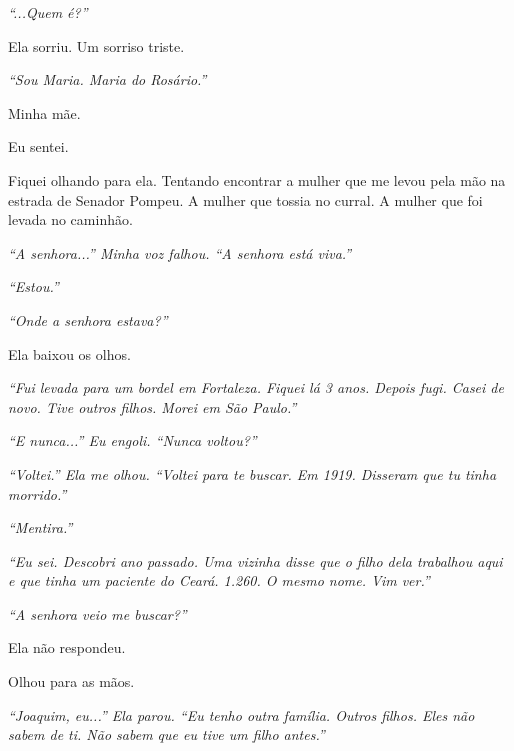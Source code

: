 \noindent \textit{\textquotedblleft{}...Quem é?\textquotedblright{}}

\noindent Ela sorriu. Um sorriso triste.

\noindent \textit{\textquotedblleft{}Sou Maria. Maria do Rosário.\textquotedblright{}}

\noindent Minha mãe.

\noindent Eu sentei.

\noindent Fiquei olhando para ela. Tentando encontrar a mulher que me levou pela mão na estrada de Senador Pompeu. A mulher que tossia no curral. A mulher que foi levada no caminhão.

\noindent \textit{\textquotedblleft{}A senhora...\textquotedblright{}\textit{ Minha voz falhou. }\textquotedblleft{}A senhora está viva.\textquotedblright{}}

\noindent \textit{\textquotedblleft{}Estou.\textquotedblright{}}

\noindent \textit{\textquotedblleft{}Onde a senhora estava?\textquotedblright{}}

\noindent Ela baixou os olhos.

\noindent \textit{\textquotedblleft{}Fui levada para um bordel em Fortaleza. Fiquei lá 3 anos. Depois fugi. Casei de novo. Tive outros filhos. Morei em São Paulo.\textquotedblright{}}

\noindent \textit{\textquotedblleft{}E nunca...\textquotedblright{}\textit{ Eu engoli. }\textquotedblleft{}Nunca voltou?\textquotedblright{}}

\noindent \textit{\textquotedblleft{}Voltei.\textquotedblright{}\textit{ Ela me olhou. }\textquotedblleft{}Voltei para te buscar. Em 1919. Disseram que tu tinha morrido.\textquotedblright{}}

\noindent \textit{\textquotedblleft{}Mentira.\textquotedblright{}}

\noindent \textit{\textquotedblleft{}Eu sei. Descobri ano passado. Uma vizinha disse que o filho dela trabalhou aqui e que tinha um paciente do Ceará. 1.260. O mesmo nome. Vim ver.\textquotedblright{}}

\noindent \textit{\textquotedblleft{}A senhora veio me buscar?\textquotedblright{}}

\noindent Ela não respondeu.

\noindent Olhou para as mãos.

\noindent \textit{\textquotedblleft{}Joaquim, eu...\textquotedblright{}\textit{ Ela parou. }\textquotedblleft{}Eu tenho outra família. Outros filhos. Eles não sabem de ti. Não sabem que eu tive um filho antes.\textquotedblright{}}

